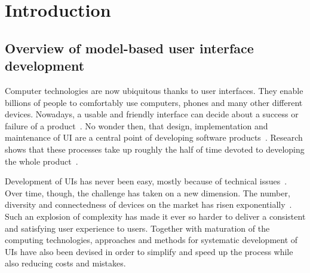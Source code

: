 \section{Introduction}\label{sec:introduction}

\subsection{Overview of model-based user interface development}\label{subsec:user-interfaces-are-important}
Computer technologies are now ubiquitous thanks to user interfaces.
They enable billions of people to comfortably use computers, phones and many other different devices.
Nowadays, a usable and friendly interface can decide about a success or failure of a product~\cite{Offutt2002}.
No wonder then, that design, implementation and maintenance of UI are a central point of developing software products~\cite{Anderson2010}.
Research shows that these processes take up roughly the half of time devoted to developing the whole product~\cite{Myers1992}.

Development of UIs has never been easy, mostly because of technical issues~\cite{Six1991}.
Over time, though, the challenge has taken on a new dimension.
The number, diversity and connectedness of devices on the market has risen exponentially~\cite{Cisco2020}.
Such an explosion of complexity has made it ever so harder to deliver a consistent and satisfying user experience to users.
Together with maturation of the computing technologies, approaches and methods for systematic development of UIs have also been devised in order to simplify and speed up the process while also reducing costs and mistakes.

